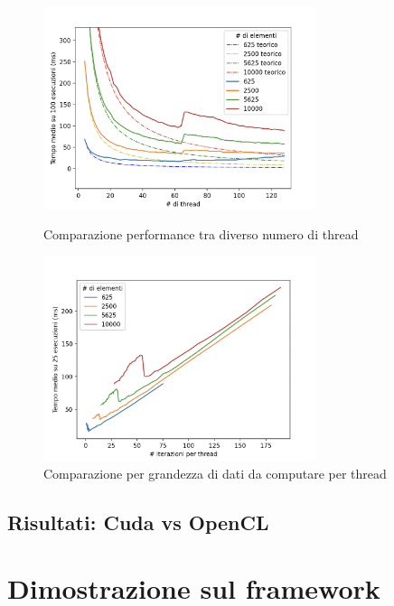 \begin{figure}[!ht]
  \begin{minipage}[t]{0.5\linewidth}
    \centering
    \includegraphics[width=8cm]{images/results/comp-threads.png}
    \caption{Comparazione performance tra diverso numero di thread}
    \label{fig:risultati-cpu}
  \end{minipage}
  \begin{minipage}[t]{0.5\linewidth}
    \centering
    \includegraphics[width=8cm]{images/results/jobs-per-thread.png}
    \caption{Comparazione per grandezza di dati da computare per thread}
    \label{fig:jobs-per-thread}
  \end{minipage}
\end{figure}

\subsection{Risultati: Cuda vs OpenCL}
\label{subsec:risultati-cuda-opencl}

\lipsum[1]

\section{Dimostrazione sul framework}
\label{sec:dimostrazione}

\lipsum[1]
